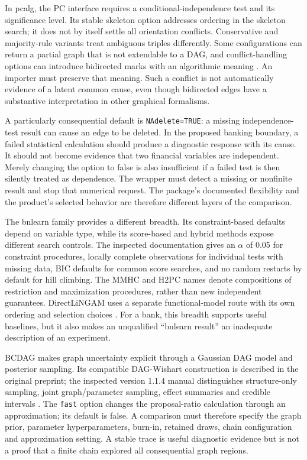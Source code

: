 In pcalg, the PC interface requires a conditional-independence test and its
significance level. Its stable skeleton option addresses ordering in the
skeleton search; it does not by itself settle all orientation conflicts.
Conservative and majority-rule variants treat ambiguous triples differently.
Some configurations can return a partial graph that is not extendable to a
DAG, and conflict-handling options can introduce bidirected marks with an
algorithmic meaning \citep{exec13_pcalg}. An importer must preserve that
meaning. Such a conflict is not automatically evidence of a latent common
cause, even though bidirected edges have a substantive interpretation in
other graphical formalisms.

A particularly consequential default is \texttt{NAdelete=TRUE}: a missing
independence-test result can cause an edge to be deleted. In the proposed
banking boundary, a failed statistical calculation should produce a diagnostic
response with its cause. It should not become evidence that two financial
variables are independent. Merely changing the option to false is also
insufficient if a failed test is then silently treated as dependence. The
wrapper must detect a missing or nonfinite result and stop that numerical
request. The package's documented flexibility and the product's selected
behavior are therefore different layers of the comparison.

The bnlearn family provides a different breadth. Its constraint-based defaults
depend on variable type, while its score-based and hybrid methods expose
different search controls. The inspected documentation gives an $\alpha$ of
0.05 for constraint procedures, locally complete observations for individual
tests with missing data, BIC defaults for common score searches, and no random
restarts by default for hill climbing. The MMHC and H2PC names denote
compositions of restriction and maximization procedures, rather than new
independent guarantees. DirectLiNGAM uses a separate functional-model route
with its own ordering and selection choices \citep{exec13_bnlearn}.
For a bank, this breadth supports useful baselines, but it also makes an
unqualified ``bnlearn result'' an inadequate description of an experiment.

BCDAG makes graph uncertainty explicit through a Gaussian DAG model and
posterior sampling. Its compatible DAG-Wishart construction is described in
the original preprint; the inspected version 1.1.4 manual distinguishes
structure-only sampling, joint graph/parameter sampling, effect summaries and
credible intervals \citep{exec13_bcdag_paper,exec13_bcdag}. The
\texttt{fast} option changes the proposal-ratio calculation through an
approximation; its default is false. A comparison must therefore specify
the graph prior, parameter hyperparameters, burn-in, retained draws, chain
configuration and approximation setting. A stable trace is useful diagnostic
evidence but is not a proof that a finite chain explored all consequential
graph regions.


